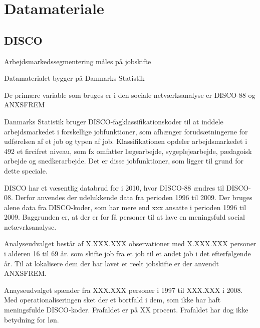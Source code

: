 

\chapter{Datamateriale \label{kapitel_metode_datamateriale}}



\section{DISCO}

Arbejdsmarkedssegmentering måles på jobskifte

Datamaterialet bygger på Danmarks Statistik

De primære variable som bruges er i den sociale netværksanalyse er DISCO-88 og ANXSFREM

Danmarks Statistik bruger DISCO-fagklassifikationskoder til at inddele arbejdsmarkedet i forskellige jobfunktioner, som afhænger forudsætningerne for udførelsen af et job og typen af job. Klassifikationen opdeler arbejdsmarkedet i 492 et fircifret niveau, som fx omfatter lægearbejde, sygeplejearbejde, pædagoisk arbejde og snedkerarbejde. Det er disse jobfunktioner, som ligger til grund for dette speciale.

DISCO har et væsentlig databrud for i 2010, hvor DISCO-88 ændres til DISCO-08. Derfor anvendes der udelukkende data fra perioden 1996 til 2009. Der bruges alene data fra DISCO-koder, som har mere end xxx ansatte i perioden 1996 til 2009. Baggrunden er, at der er for få personer til at lave en meningsfuld social netævrksanalyse.

Analyseudvalget består af X.XXX.XXX observationer med X.XXX.XXX personer i alderen 16 til 69 år. som skifte job fra et job til et andet job i det efterfølgende år. Til at lokalisere dem der har lavet et reelt jobskifte er der anvendt ANXSFREM.

Anayseudvalget spænder fra XXX.XXX personer i 1997 til XXX.XXX i 2008. Med operationaliseringen sket der et bortfald i dem, som ikke har haft meningsfulde DISCO-koder. Frafaldet er på XX procent. Frafaldet har dog ikke betydning for løn.



